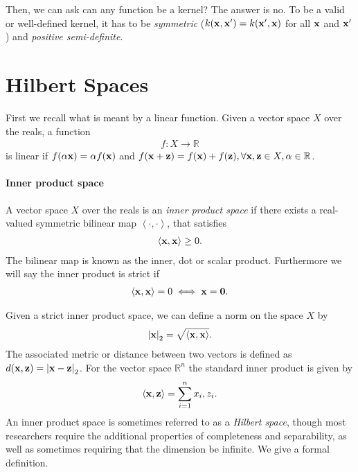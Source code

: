 Then, we can ask can any function be a kernel? The answer is no. To be a valid or well-defined kernel, it has to be \textit{symmetric} (\ie  $k({\mathbf{x}}, {\mathbf{x}}') = k({\mathbf{x}}', {\mathbf{x}})$ for all ${\mathbf{x}}$ and ${\mathbf{x}}'$) and \textit{positive semi-definite}. 


\section{Hilbert Spaces}

First we recall what is meant by a linear function. Given a vector space $X$ over the reals, a function
\begin{align*}
	f: X\longrightarrow \mathbb{R}
\end{align*}
is linear if $f(\alpha{\mathbf{x}}) = \alpha f({\mathbf{x}})$ and $f({\mathbf{x}}+{\mathbf{z}}) = f({\mathbf{x}})+ f({\mathbf{z}}), \forall {\mathbf{x}},{\mathbf{z}} \in X, \alpha\in \mathbb{R}$. 

\paragraph{Inner product space} A vector space $X$ over the reals  is an \textit{inner product space} if there exists a real-valued symmetric bilinear map $\left<\cdot, \cdot\right>$, that satisfies
\begin{align*}
	\left<{\mathbf{x}},{\mathbf{x}}\right>\geq 0.
\end{align*}
The bilinear map is known as the inner, dot or scalar product. Furthermore we will say the inner product is strict if 
\begin{align*}
	\left<{\mathbf{x}}, {\mathbf{x}}\right>=0 \iff {\mathbf{x}}=\mathbf{0}.
\end{align*}

Given a strict inner product space, we can define a norm on the space $X$ by 
\begin{align*}
	\left|{\mathbf{x}}\right|_2=\sqrt{\left<{\mathbf{x}}, {\mathbf{x}}\right>}.
\end{align*}
The associated metric or distance between two vectors is defined as $d({\mathbf{x}}, {\mathbf{z}}) = \left|{\mathbf{x}}-{\mathbf{z}}\right|_2$. For the vector space $\mathbb{R}^n$ the standard inner product is given by 
\begin{align*}
	\left<{\mathbf{x}}, {\mathbf{z}}\right> = \sum_{i=1}^n x_i,z_i.
\end{align*}
An inner product space is sometimes referred to as a \textit{Hilbert space}, though most researchers require the additional properties of completeness and separability, as well as sometimes requiring that the dimension be infinite. We give a formal definition.

